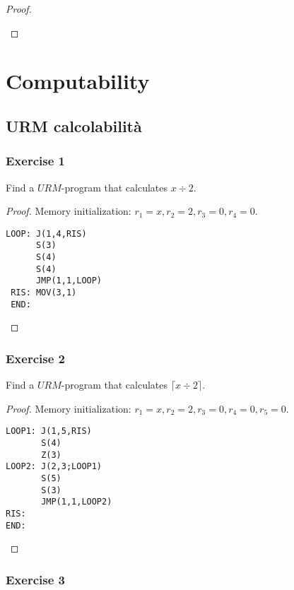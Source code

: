 \documentclass[12pt,a4paper,oneside]{book}
\begin{document}
\begin{exercise}
\begin{proof}
\begin{itemize}
        \end{itemize}
    \end{proof}
\end{exercise}


\chapter{Computability}

\section{URM calcolabilità}

\subsection{Exercise 1}

\begin{exercise}
    Find a $URM$-program that calculates $x \div 2$.

    \begin{proof}
        Memory initialization: $r_1 = x, r_2 = 2, r_3 = 0, r_4 = 0$.

\begin{verbatim}
LOOP: J(1,4,RIS)
      S(3)
      S(4)
      S(4)
      JMP(1,1,LOOP)
 RIS: MOV(3,1)
 END:
\end{verbatim}
    \end{proof}
\end{exercise}

\subsection{Exercise 2}

\begin{exercise}
    Find a $URM$-program that calculates $\lceil x \div 2 \rceil$.

    \begin{proof}
        Memory initialization: $r_1 = x, r_2 = 2, r_3 = 0, r_4 = 0, r_5 = 0$.

\begin{verbatim}
LOOP1: J(1,5,RIS)
       S(4)
       Z(3)
LOOP2: J(2,3;LOOP1)
       S(5)
       S(3)
       JMP(1,1,LOOP2)
RIS:
END:
\end{verbatim}
    \end{proof}
\end{exercise}

\subsection{Exercise 3}
\end{document}
